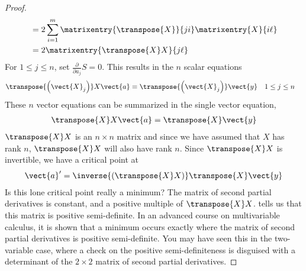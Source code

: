 \begin{proof}
\begin{align*}
%
&=2\sum_{i=1}^m\matrixentry{\transpose{X}}{ji}\matrixentry{X}{i\ell}\\
%
&=2\matrixentry{\transpose{X}X}{j\ell}
%
\end{align*}
%
For $1\leq j\leq n$, set $\frac{\partial}{\partial a_j}S=0$.  This results in the $n$ scalar equations
%
\begin{align*}
\transpose{\left(\vect{X}_j\right)}X\vect{a}
&=\transpose{\left(\vect{X}_j\right)}\vect{y}
&
1\leq j\leq n&
\end{align*}
%
These $n$ vector equations can be summarized in the single vector equation,
%
\begin{align*}
\transpose{X}X\vect{a}=\transpose{X}\vect{y}
\end{align*}
%
$\transpose{X}X$ is an $n\times n$ matrix and since we have assumed that $X$ has rank $n$, $\transpose{X}X$ will also have rank $n$.  Since $\transpose{X}X$ is invertible, we have a critical point at
%
\begin{align*}
\vect{a}^\prime=\inverse{\left(\transpose{X}X\right)}\transpose{X}\vect{y}
\end{align*}
%
Is this lone critical point really a minimum?  The matrix of second partial derivatives is constant, and a positive multiple of $\transpose{X}X$.   tells us that this matrix is positive semi-definite.  In an advanced course on multivariable calculus, it is shown that a minimum occurs exactly where the matrix of second partial derivatives is positive semi-definite.  You may have seen this in the two-variable case, where a check on the positive semi-definiteness is disguised with a determinant of the $2\times 2$ matrix of second partial derivatives.
%
\end{proof}



%
